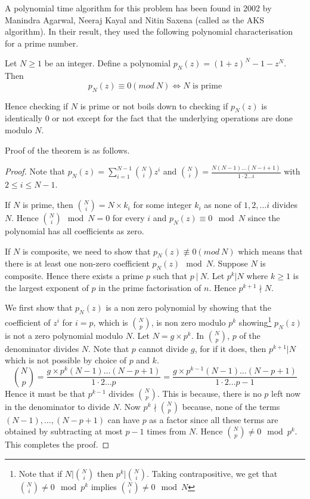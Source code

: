 A polynomial time algorithm for this problem has been found in 2002 by
Manindra Agarwal, Neeraj Kayal and Nitin Saxena (called as the AKS algorithm). 
In their result, they used the following polynomial characterisation for a
prime number.
\begin{theorem} Let $N \ge 1$ be
	an integer. Define a polynomial 
	$p_N(z) = (1+z)^N - 1 - z^N$. Then \[ p_N(z) \equiv 0 (mod~ N)
	\iff N \text{ is prime} \]
\end{theorem}

Hence checking if $N$ is prime or not boils down to checking if $p_N(z)$ is
identically $0$ or not except for the fact that the underlying operations are
done modulo $N$.

Proof of the theorem is as follows.
\begin{proof}
	Note that $p_N(z) = \sum_{i=1}^{N-1} \binom{N}{i} z^i$ and
	$\binom{N}{i} = \frac{N(N-1)\ldots (N-i+1)}{1\cdot 2 \ldots i}$ with $2
	\le i \le N-1$. 

	If $N$ is prime, then $\binom{N}{i} = N \times k_i$ for some integer
	$k_i$ as none of $1, 2, \ldots i$ divides $N$. Hence $\binom{N}{i}
	\mod N = 0$ for every $i$ and $p_N(z) \equiv 0 \mod N$ since the
	polynomial has all coefficients as zero.

	If $N$ is composite, we need to show that $p_N(z) \not 
	\equiv 0 (mod~ N)$ which means that there is at least one non-zero
	coefficient $p_N(z) \mod N$. Suppose $N$ is
	composite. Hence there exists a prime $p$ such that $p ~|~
	N$.  Let $p^k | N$ where $k \ge 1$ is the largest exponent of $p$ in
	the prime factorisation of $n$. Hence $p^{k+1} \nmid N$.
	
	We first show that $p_N(z)$ is a non zero polynomial by showing that
	the coefficient of $z^i$ for $i = p$, which is $\binom{N}{p}$, is non
	zero modulo $p^k$ showing\footnote{Note that if
		$N|\binom{N}{i}$ then $p^k | \binom{N}{i}$. Taking
		contrapositive, we get that $\binom{N}{i} \not = 0 \mod p^k$
		implies $\binom{N}{i} \not = 0 \mod N$} $p_N(z)$ is not a zero
		polynomial modulo $N$. 
	Let $N = g \times p^k$. In $\binom{N}{p}$, $p$ of the denominator 
	divides $N$. Note that $p$ cannot divide $g$, for if it does, then
	$p^{k+1} | N$ which is not possible by choice of $p$ and $k$.
		\begin{equation}
		\binom{N}{p} = \frac{g\times p^k(N-1)\ldots (N-p+1)}
		{1\cdot 2 \ldots p} = \frac{g\times p^{k-1}(N-1)\ldots 
			\label{eq:ag-bis-proof}
		(N-p+1)}{1\cdot 2 \ldots p-1} \end{equation}
	Hence it must be that $p^{k-1}$ divides $\binom{N}{p}$. This is
	because, there is no $p$ left now in the denominator to divide $N$.
	Now $p^k \nmid \binom{N}{p}$ because, none of the terms $(N-1),
	\ldots,
	(N-p+1)$ can have $p$ as a factor since all these terms are obtained by
	subtracting at most $p-1$ times from $N$. Hence $\binom{N}{p} \ne 0
	\mod p^k$. This completes the proof.
\end{proof}

